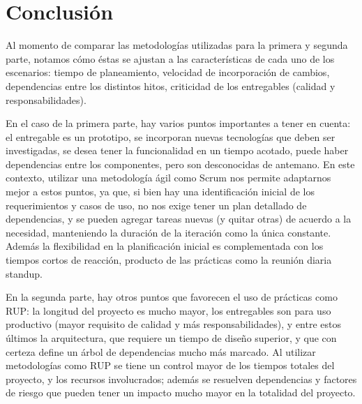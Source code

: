 \section*{Conclusi\'on}

Al momento de comparar las metodolog\'ias utilizadas para la primera y segunda parte, notamos c\'omo \'estas se ajustan a las caracter\'isticas de cada uno de los escenarios: tiempo de planeamiento, velocidad de incorporaci\'on de cambios, dependencias entre los distintos hitos, criticidad de los entregables (calidad y responsabilidades).

En el caso de la primera parte, hay varios puntos importantes a tener en cuenta: el entregable es un prototipo, se incorporan nuevas tecnolog\'ias que deben ser investigadas, se desea tener la funcionalidad en un tiempo acotado, puede haber dependencias entre los componentes, pero son desconocidas de antemano. En este contexto, utilizar una metodolog\'ia \'agil como Scrum nos permite adaptarnos mejor a estos puntos, ya que, si bien hay una identificaci\'on inicial de los requerimientos y casos de uso, no nos exige tener un plan detallado de dependencias, y se pueden agregar tareas nuevas (y quitar otras) de acuerdo a la necesidad, manteniendo la duraci\'on de la iteraci\'on como la \'unica constante. Adem\'as la flexibilidad en la planificaci\'on inicial es complementada con los tiempos cortos de reacci\'on, producto de las pr\'acticas como la reuni\'on diaria standup.

En la segunda parte, hay otros puntos que favorecen el uso de pr\'acticas como RUP: la longitud del proyecto es mucho mayor, los entregables son para uso productivo (mayor requisito de calidad y m\'as responsabilidades), y entre estos \'ultimos la arquitectura, que requiere un tiempo de dise\~no superior, y que con certeza define un \'arbol de dependencias mucho m\'as marcado. Al utilizar metodolog\'ias como RUP se tiene un control mayor de los tiempos totales del proyecto, y los recursos involucrados; adem\'as se resuelven dependencias y factores de riesgo que pueden tener un impacto mucho mayor en la totalidad del proyecto.
